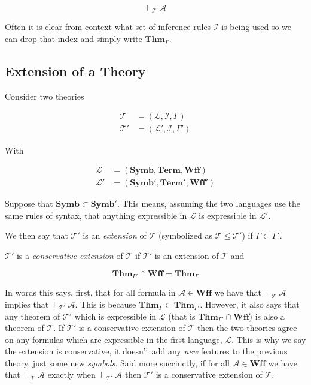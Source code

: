 \documentclass[12pt]{article}
\newcommand{\bv}[1]{\boldsymbol{#1}}
\newcommand{\mc}[1]{\mathcal{#1}}
\newcommand{\bc}[1]{\bv{\mc{#1}}}
\begin{document}
\begin{equation}
\vdash_{\bc{T}} \mc{A}
\end{equation}

Often it is clear from context what set of inference rules $\bc{I}$ is being used so we can drop that index and simply write $\textbf{Thm}_{\Gamma}$.


\subsection*{Extension of a Theory}

Consider two theories

\begin{equation}
\begin{split}
\bc{T} &= (\bv{\mc{L}},\bc{I},\Gamma)\\
\bc{T}' &= (\bv{\mc{L}}',\bc{I},\Gamma')
\end{split}
\end{equation}

With

\begin{equation}
\begin{split}
\bv{\mc{L}} &= (\textbf{Symb},\textbf{Term},\textbf{Wff})\\
\bv{\mc{L}'} &= (\textbf{Symb}',\textbf{Term}',\textbf{Wff}')
\end{split}
\end{equation}

Suppose that $\textbf{Symb} \subset \textbf{Symb}'$. This means, assuming the two languages use the same rules of syntax, that anything expressible in $\bv{\mc{L}}$ is expressible in $\bv{\mc{L}}'$.

We then say that $\bc{T}'$ is an \textit{extension} of $\bc{T}$ (symbolized as $\bc{T} \le \bc{T}'$) if $\Gamma \subset \Gamma'$. 

$\bc{T}'$ is a \textit{conservative extension} of $\bc{T}$ if $\bc{T}'$ is an extension of $\bc{T}$ and

$$
\textbf{Thm}_{\Gamma'} \cap \textbf{Wff} = \textbf{Thm}_{\Gamma}
$$

In words this says, first, that for all formula in $\mc{A} \in \textbf{Wff}$ we have that $\vdash_{\bc{T}} \mc{A}$ implies that $\vdash_{\bc{T}'} \mc{A}$. This is because $\textbf{Thm}_{\Gamma}\subset \textbf{Thm}_{\Gamma'}$. However, it also says that any theorem of $\bc{T}'$ which is expressible in $\bv{\mc{L}}$ (that is $\textbf{Thm}_{\Gamma'} \cap \textbf{Wff}$) is also a theorem of $\bc{T}$. If $\bc{T}'$ is a conservative extension of $\bc{T}$ then the two theories agree on any formulas which are expressible in the first language, $\bv{\mc{L}}$. This is why we say the extension is conservative, it doesn't add any \textit{new} features to the previous theory, just some new \textit{symbols}. Said more succinctly, if for all $\mc{A} \in \textbf{Wff}$ we have that $\vdash_{\bc{T}} \mc{A}$ exactly when $\vdash_{\bc{T}'} \mc{A}$ then $\bc{T}'$ is a conservative extension of $\bc{T}$.
\end{document}
